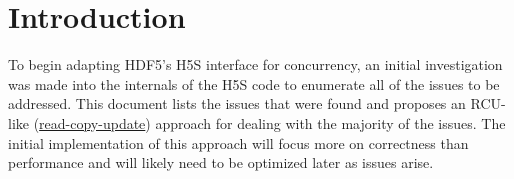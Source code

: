 \documentclass[../HDF5_RFC.tex]{subfiles}
\begin{document}
\section{Introduction}
\label{intro}

To begin adapting HDF5's H5S interface for concurrency, an initial investigation was made into the internals
of the H5S code to enumerate all of the issues to be addressed. This document lists the issues that were
found and proposes an RCU-like (\href{https://en.wikipedia.org/wiki/Read-copy-update}{read-copy-update})
approach for dealing with the majority of the issues. The initial implementation of this approach will focus
more on correctness than performance and will likely need to be optimized later as issues arise.
\end{document}
